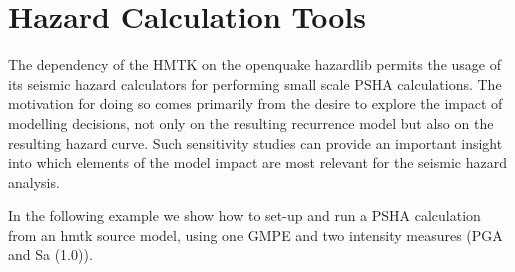 \section{Hazard Calculation Tools}

The dependency of the HMTK on the openquake hazardlib permits the usage of its seismic hazard calculators for performing small scale PSHA calculations. The motivation for doing so comes primarily from the desire to explore the impact of modelling decisions, not only on the resulting recurrence model but also on the resulting hazard curve. Such sensitivity studies can provide an important insight into which elements of the model impact are most relevant for the seismic hazard analysis.

In the following example we show how to set-up and run a PSHA calculation from an hmtk source model, using one GMPE \parencite{akkar2010} and two intensity measures (PGA and Sa (1.0)). 

